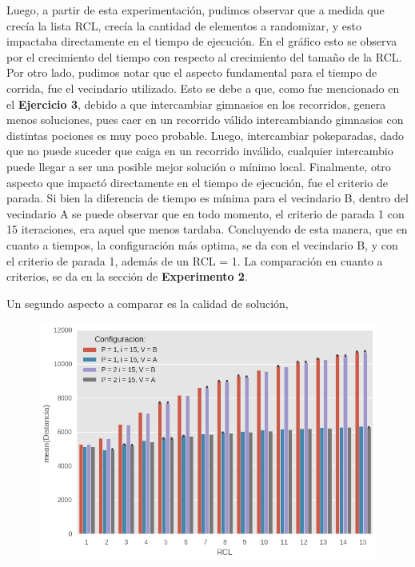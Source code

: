   Luego, a partir de esta experimentación, pudimos observar que a medida que crecía la lista RCL, crecía la cantidad de elementos a randomizar, y esto impactaba directamente en el tiempo de ejecución. En el gráfico esto se observa por el crecimiento del tiempo con respecto al crecimiento del tamaño de la RCL. Por otro lado, pudimos notar que el aspecto fundamental para el tiempo de corrida, fue el vecindario utilizado. Esto se debe a que, como fue mencionado en el \textbf{Ejercicio 3}, debido a que intercambiar gimnasios en los recorridos, genera menos soluciones, pues caer en un recorrido válido intercambiando gimnasios con distintas pociones es muy poco probable. Luego, intercambiar pokeparadas, dado que no puede suceder que caiga en un recorrido inválido, cualquier intercambio puede llegar a ser una posible mejor solución o mínimo local. Finalmente, otro aspecto que impactó directamente en el tiempo de ejecución, fue el criterio de parada. Si bien la diferencia de tiempo es mínima para el vecindario B, dentro del vecindario A se puede observar que en todo momento, el criterio de parada 1 con 15 iteraciones, era aquel que menos tardaba. Concluyendo de esta manera, que en cuanto a tiempos, la configuración más optima, se da con el vecindario B, y con el criterio de parada 1, además de un RCL = 1. La comparación en cuanto a criterios, se da en la sección de \textbf{Experimento 2}.

  \par Un segundo aspecto a comparar es la calidad de solución,

\begin{figure}[H]
    \begin{center}
      \includegraphics[width=0.7\columnwidth]{imagenes/Ej4/ej4_exp1_Distancia.png}
    \end{center}
\end{figure}


